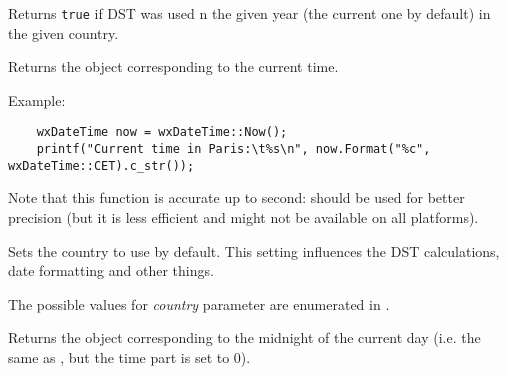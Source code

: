 \label{wxdatetimeisdstapplicable}


Returns {\tt true} if DST was used n the given year (the current one by
default) in the given country.


\label{wxdatetimenow}


Returns the object corresponding to the current time.

Example:

\begin{verbatim}
    wxDateTime now = wxDateTime::Now();
    printf("Current time in Paris:\t%s\n", now.Format("%c", wxDateTime::CET).c_str());
\end{verbatim}

Note that this function is accurate up to second:
 should be used for better precision
(but it is less efficient and might not be available on all platforms).




\label{wxdatetimesetcountry}


Sets the country to use by default. This setting influences the DST
calculations, date formatting and other things.

The possible values for {\it country} parameter are enumerated in
.




\label{wxdatetimetoday}


Returns the object corresponding to the midnight of the current day (i.e. the
same as , but the time part is set to $0$).




\label{wxdatetimeunow}

